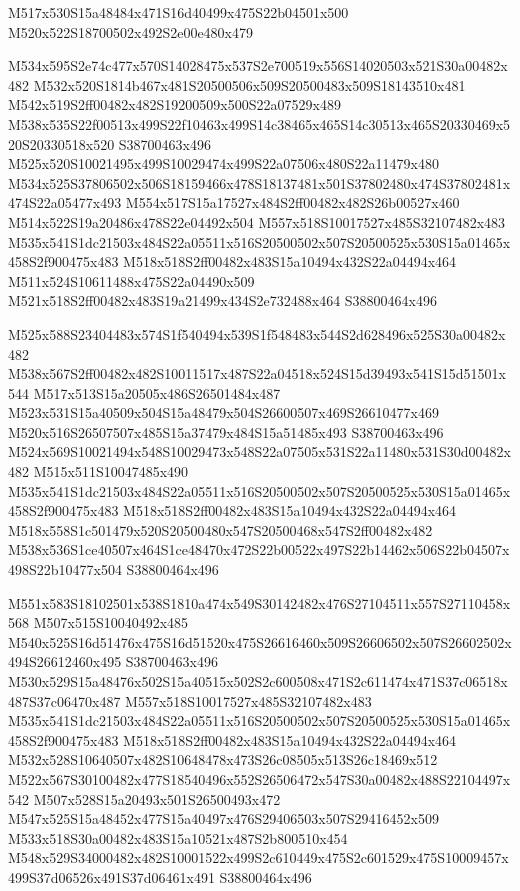 \documentclass{article}
\begin{document}
\begin{multicols}{2}
\begin{center}
M517x530S15a48484x471S16d40499x475S22b04501x500 M520x522S18700502x492S2e00e480x479 
\end{center}


M534x595S2e74c477x570S14028475x537S2e700519x556S14020503x521S30a00482x482 M532x520S1814b467x481S20500506x509S20500483x509S18143510x481 M542x519S2ff00482x482S19200509x500S22a07529x489 M538x535S22f00513x499S22f10463x499S14c38465x465S14c30513x465S20330469x520S20330518x520 S38700463x496 M525x520S10021495x499S10029474x499S22a07506x480S22a11479x480 M534x525S37806502x506S18159466x478S18137481x501S37802480x474S37802481x474S22a05477x493 M554x517S15a17527x484S2ff00482x482S26b00527x460 M514x522S19a20486x478S22e04492x504 M557x518S10017527x485S32107482x483 M535x541S1dc21503x484S22a05511x516S20500502x507S20500525x530S15a01465x458S2f900475x483 M518x518S2ff00482x483S15a10494x432S22a04494x464 M511x524S10611488x475S22a04490x509 M521x518S2ff00482x483S19a21499x434S2e732488x464 S38800464x496

M525x588S23404483x574S1f540494x539S1f548483x544S2d628496x525S30a00482x482 M538x567S2ff00482x482S10011517x487S22a04518x524S15d39493x541S15d51501x544 M517x513S15a20505x486S26501484x487 M523x531S15a40509x504S15a48479x504S26600507x469S26610477x469 M520x516S26507507x485S15a37479x484S15a51485x493 S38700463x496 M524x569S10021494x548S10029473x548S22a07505x531S22a11480x531S30d00482x482 M515x511S10047485x490 M535x541S1dc21503x484S22a05511x516S20500502x507S20500525x530S15a01465x458S2f900475x483 M518x518S2ff00482x483S15a10494x432S22a04494x464 M518x558S1c501479x520S20500480x547S20500468x547S2ff00482x482 M538x536S1ce40507x464S1ce48470x472S22b00522x497S22b14462x506S22b04507x498S22b10477x504 S38800464x496

M551x583S18102501x538S1810a474x549S30142482x476S27104511x557S27110458x568 M507x515S10040492x485 M540x525S16d51476x475S16d51520x475S26616460x509S26606502x507S26602502x494S26612460x495 S38700463x496 M530x529S15a48476x502S15a40515x502S2c600508x471S2c611474x471S37c06518x487S37c06470x487 M557x518S10017527x485S32107482x483 M535x541S1dc21503x484S22a05511x516S20500502x507S20500525x530S15a01465x458S2f900475x483 M518x518S2ff00482x483S15a10494x432S22a04494x464 M532x528S10640507x482S10648478x473S26c08505x513S26c18469x512 M522x567S30100482x477S18540496x552S26506472x547S30a00482x488S22104497x542 M507x528S15a20493x501S26500493x472 M547x525S15a48452x477S15a40497x476S29406503x507S29416452x509 M533x518S30a00482x483S15a10521x487S2b800510x454 M548x529S34000482x482S10001522x499S2c610449x475S2c601529x475S10009457x499S37d06526x491S37d06461x491 S38800464x496


\end{multicols}
\end{document}
